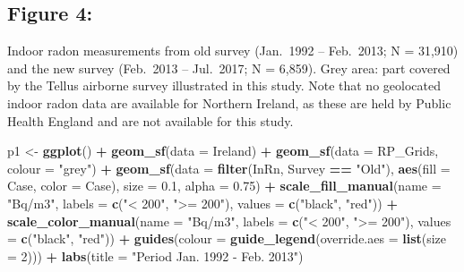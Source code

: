 \documentclass[
  12pt,
]{article}
\newenvironment{Shaded}{\begin{snugshade}}{\end{snugshade}}
\newcommand{\DataTypeTok}[1]{\textcolor[rgb]{0.13,0.29,0.53}{#1}}
\newcommand{\DecValTok}[1]{\textcolor[rgb]{0.00,0.00,0.81}{#1}}
\newcommand{\FloatTok}[1]{\textcolor[rgb]{0.00,0.00,0.81}{#1}}
\newcommand{\KeywordTok}[1]{\textcolor[rgb]{0.13,0.29,0.53}{\textbf{#1}}}
\newcommand{\NormalTok}[1]{#1}
\newcommand{\OperatorTok}[1]{\textcolor[rgb]{0.81,0.36,0.00}{\textbf{#1}}}
\newcommand{\StringTok}[1]{\textcolor[rgb]{0.31,0.60,0.02}{#1}}
\begin{document}
\hypertarget{figure-4}{%
\subsection{Figure 4:}\label{figure-4}}

Indoor radon measurements from old survey (Jan.~1992 -- Feb.~2013; N =
31,910) and the new survey (Feb.~2013 -- Jul.~2017; N = 6,859). Grey
area: part covered by the Tellus airborne survey illustrated in this
study. Note that no geolocated indoor radon data are available for
Northern Ireland, as these are held by Public Health England and are not
available for this study.

\begin{Shaded}
\begin{Highlighting}[]
\NormalTok{  p1 \textless{}{-}}\StringTok{ }\KeywordTok{ggplot}\NormalTok{() }\OperatorTok{+}
\StringTok{    }\KeywordTok{geom\_sf}\NormalTok{(}\DataTypeTok{data =}\NormalTok{ Ireland) }\OperatorTok{+}
\StringTok{    }\KeywordTok{geom\_sf}\NormalTok{(}\DataTypeTok{data =}\NormalTok{ RP\_Grids, }\DataTypeTok{colour =} \StringTok{"grey"}\NormalTok{) }\OperatorTok{+}
\StringTok{    }\KeywordTok{geom\_sf}\NormalTok{(}\DataTypeTok{data =} \KeywordTok{filter}\NormalTok{(InRn, Survey }\OperatorTok{==}\StringTok{ "Old"}\NormalTok{),}
            \KeywordTok{aes}\NormalTok{(}\DataTypeTok{fill =}\NormalTok{ Case, }\DataTypeTok{color =}\NormalTok{ Case),}
            \DataTypeTok{size =} \FloatTok{0.1}\NormalTok{,}
            \DataTypeTok{alpha =} \FloatTok{0.75}\NormalTok{) }\OperatorTok{+}
\StringTok{    }\KeywordTok{scale\_fill\_manual}\NormalTok{(}\DataTypeTok{name =} \StringTok{"Bq/m3"}\NormalTok{,}
                      \DataTypeTok{labels =} \KeywordTok{c}\NormalTok{(}\StringTok{"\textless{} 200"}\NormalTok{,}
                                 \StringTok{"\textgreater{}= 200"}\NormalTok{),}
                      \DataTypeTok{values =} \KeywordTok{c}\NormalTok{(}\StringTok{"black"}\NormalTok{,}
                                 \StringTok{"red"}\NormalTok{)) }\OperatorTok{+}
\StringTok{    }\KeywordTok{scale\_color\_manual}\NormalTok{(}\DataTypeTok{name =} \StringTok{"Bq/m3"}\NormalTok{,}
                       \DataTypeTok{labels =} \KeywordTok{c}\NormalTok{(}\StringTok{"\textless{} 200"}\NormalTok{,}
                                  \StringTok{"\textgreater{}= 200"}\NormalTok{),}
                       \DataTypeTok{values =} \KeywordTok{c}\NormalTok{(}\StringTok{"black"}\NormalTok{,}
                                  \StringTok{"red"}\NormalTok{)) }\OperatorTok{+}
\StringTok{    }\KeywordTok{guides}\NormalTok{(}\DataTypeTok{colour =} \KeywordTok{guide\_legend}\NormalTok{(}\DataTypeTok{override.aes =} \KeywordTok{list}\NormalTok{(}\DataTypeTok{size =} \DecValTok{2}\NormalTok{))) }\OperatorTok{+}
\StringTok{    }\KeywordTok{labs}\NormalTok{(}\DataTypeTok{title =} \StringTok{"Period Jan. 1992 {-} Feb. 2013"}\NormalTok{) }


\end{Highlighting}
\end{Shaded}
\end{document}
